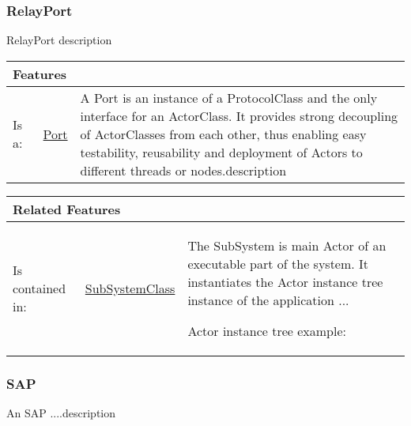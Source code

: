 			
		
		\subsubsection{RelayPort}
			\hypertarget{ref:RelayPort}{}
			
			RelayPort description
			
			
			\vspace{\baselineskip}
			\begingroup
			\renewcommand{\arraystretch}{1.8} %
			\parbox{\textwidth}{
			\begin{longtable}{l l p{}}
				\multicolumn{2}{l}{\textbf{\large Features}} & \\
				\hline
			Is a: & \tabitem \hyperlink{ref:Port}{Port}  & A Port is an instance of a ProtocolClass and the only interface for an ActorClass. It provides strong decoupling of ActorClasses from each other, thus enabling easy testability, reusability and deployment of Actors to different threads or nodes.description \\
			\hline
			\end{longtable}	
			}
			\endgroup
			\vspace{\baselineskip}
			
			\vspace{\baselineskip}
			\begingroup
			\renewcommand{\arraystretch}{1.8} %
			\parbox{\textwidth}{
			\begin{longtable}{l l p{}}
				\multicolumn{2}{l}{\textbf{\large Related Features}} & \\
				\hline
			Is contained in: & \tabitem \hyperlink{ref:SubSystemClass}{SubSystemClass}  & The SubSystem is main Actor of an executable part of the system. It instantiates the Actor instance tree instance of the application ...
				
				Actor instance tree example:
			\\
			\hline
			\end{longtable}	
			}
			\endgroup
			\vspace{\baselineskip}
			
			
		
		\subsubsection{SAP}
			\hypertarget{ref:SAP}{}
			
			An SAP ....description 
			
